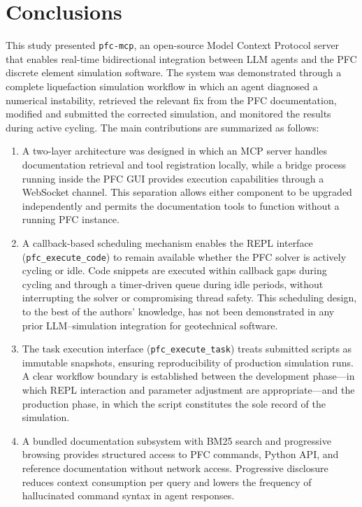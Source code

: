 \section{Conclusions}
\label{sec:conclusions}

This study presented \texttt{pfc-mcp}, an open-source Model Context Protocol server that enables real-time bidirectional integration between LLM agents and the PFC discrete element simulation software. The system was demonstrated through a complete liquefaction simulation workflow in which an agent diagnosed a numerical instability, retrieved the relevant fix from the PFC documentation, modified and submitted the corrected simulation, and monitored the results during active cycling. The main contributions are summarized as follows:

\begin{enumerate}

  \item A two-layer architecture was designed in which an MCP server handles documentation retrieval and tool registration locally, while a bridge process running inside the PFC GUI provides execution capabilities through a WebSocket channel. This separation allows either component to be upgraded independently and permits the documentation tools to function without a running PFC instance.

  \item A callback-based scheduling mechanism enables the REPL interface (\texttt{pfc\_execute\_code}) to remain available whether the PFC solver is actively cycling or idle. Code snippets are executed within callback gaps during cycling and through a timer-driven queue during idle periods, without interrupting the solver or compromising thread safety. This scheduling design, to the best of the authors' knowledge, has not been demonstrated in any prior LLM--simulation integration for geotechnical software.

  \item The task execution interface (\texttt{pfc\_execute\_task}) treats submitted scripts as immutable snapshots, ensuring reproducibility of production simulation runs. A clear workflow boundary is established between the development phase---in which REPL interaction and parameter adjustment are appropriate---and the production phase, in which the script constitutes the sole record of the simulation.

  \item A bundled documentation subsystem with BM25 search and progressive browsing provides structured access to PFC commands, Python API, and reference documentation without network access. Progressive disclosure reduces context consumption per query and lowers the frequency of hallucinated command syntax in agent responses.


\end{enumerate}
